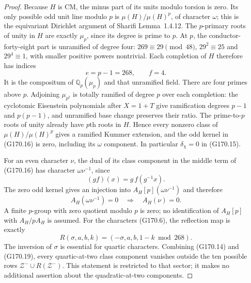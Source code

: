 \begin{proof}
Because $H$ is CM, the minus part of its units modulo torsion
is zero.  Its only possible odd unit line modulo $p$ is
$\mu(H)/\mu(H)^p$, of character $\omega$; this is the
equivariant Dirichlet argument of Sharifi Lemma~1.4.12.
The $p$-primary roots of unity in $H$ are exactly $\mu_p$,
since its degree is prime to $p$.
At $p$, the conductor-forty-eight part is unramified of degree
four: $269\equiv29\pmod{48}$, $29^2\equiv25$ and
$29^4\equiv1$, with smaller positive powers nontrivial.
Each completion of $H$ therefore has indices
\[
                   e=p-1=268,\qquad f=4.
 \tag{G170.17}
\]
It is the compositum of $\mathbb Q_p(\mu_p)$ and that
unramified field.  There are four primes above $p$.
Adjoining $\mu_{p^2}$ is totally ramified of degree $p$ over
each completion: the cyclotomic Eisenstein polynomials after
$X=1+T$ give ramification degrees $p-1$ and $p(p-1)$,
and unramified base change preserves their ratio.
The prime-to-$p$ roots of unity already have $p$th roots in $H$.
Hence every nonzero class of $\mu(H)/\mu(H)^p$ gives a
ramified Kummer extension, and the odd kernel in (G170.16)
is zero, including its $\omega$ component.
In particular $\delta_\chi=0$ in (G170.15).

For an even character $\nu$, the dual of its class component
in the middle term of (G170.16) has character
$\omega\nu^{-1}$, since
\[
                        (g f)(x)=g\,f(g^{-1}x).
 \tag{G170.18}
\]
The zero odd kernel gives an injection into
$A_H[p](\omega\nu^{-1})$ and therefore
\[
 A_H(\omega\nu^{-1})=0\quad\Longrightarrow\quad A_H(\nu)=0.
 \tag{G170.19}
\]
A finite $p$-group with zero quotient modulo $p$ is zero;
no identification of $A_H[p]$ with $A_H/pA_H$ is assumed.
For the characters (G170.6), the reflection map is exactly
\[
          R(\sigma,a,b,k)=(-\sigma,a,b,1-k\bmod268).
 \tag{G170.20}
\]
The inversion of $\sigma$ is essential for quartic characters.
Combining (G170.14) and (G170.19), every quartic-at-two
class component vanishes outside the ten possible rows
$\mathcal Z^-\cup R(\mathcal Z^-)$.
This statement is restricted to that sector; it makes no
additional assertion about the quadratic-at-two components.


\end{proof}
